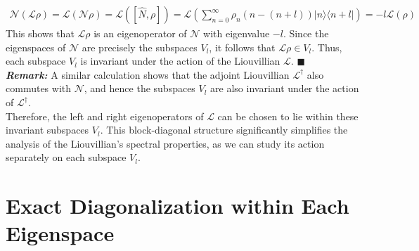 \documentclass[11pt,a4paper]{article}
\begin{document}
\begin{align}
    \mathcal{N}(\mathcal{L} \rho) = \mathcal{L}(\mathcal{N} \rho) = \mathcal{L}([\hat{N}, \rho]) = \mathcal{L} \left( \sum_{n=0}^{\infty} \rho_n (n - (n+l)) |n\rangle \langle n+l| \right) = -l \mathcal{L}(\rho)
\end{align}
This shows that $\mathcal{L} \rho$ is an eigenoperator of $\mathcal{N}$ with eigenvalue $-l$. Since the eigenspaces of $\mathcal{N}$ are precisely the subspaces $V_l$, it follows that $\mathcal{L} \rho \in V_l$. Thus, each subspace $V_l$ is invariant under the action of the Liouvillian $\mathcal{L}$. \hspace{4 mm} $\blacksquare$ \\
\textit{\textbf{Remark: }} A similar calculation shows that the adjoint Liouvillian $\mathcal{L}^\dagger$ also commutes with $\mathcal{N}$, and hence the subspaces $V_l$ are also invariant under the action of $\mathcal{L}^\dagger$. \\
Therefore, the left and right eigenoperators of $\mathcal{L}$ can be chosen to lie within these invariant subspaces $V_l$. This block-diagonal structure significantly simplifies the analysis of the Liouvillian's spectral properties, as we can study its action separately on each subspace $V_l$.

\section{Exact Diagonalization within Each Eigenspace}
\end{document}

